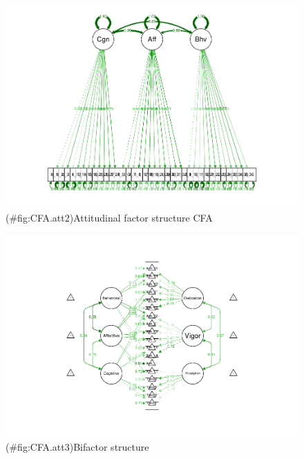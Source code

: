 \documentclass[
  english,
  man]{apa6}
\begin{document}
\begin{figure}
\centering
\includegraphics{SIOPpapaja_files/figure-latex/CFA.att2-1.pdf}
\caption{(\#fig:CFA.att2)Attitudinal factor structure CFA}
\end{figure}

\begin{figure}
\centering
\includegraphics{SIOPpapaja_files/figure-latex/CFA.att3-1.pdf}
\caption{(\#fig:CFA.att3)Bifactor structure}
\end{figure}
\end{document}
